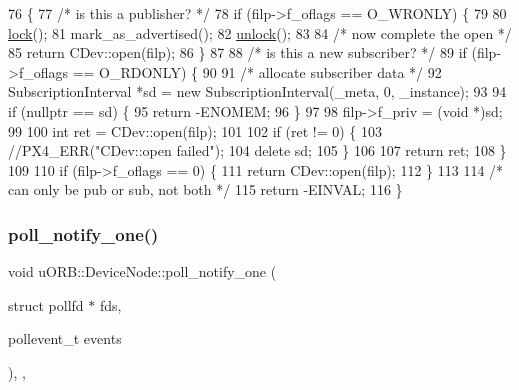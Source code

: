 \begin{DoxyCode}
76 \{
77     \textcolor{comment}{/* is this a publisher? */}
78     \textcolor{keywordflow}{if} (filp->f\_oflags == O\_WRONLY) \{
79 
80         \hyperlink{classcdev_1_1CDev_ae676cccee31dd393ab681414a146d868}{lock}();
81         mark\_as\_advertised();
82         \hyperlink{classcdev_1_1CDev_af65273e0578b277deea057dc7d558e9d}{unlock}();
83 
84         \textcolor{comment}{/* now complete the open */}
85         \textcolor{keywordflow}{return} CDev::open(filp);
86     \}
87 
88     \textcolor{comment}{/* is this a new subscriber? */}
89     \textcolor{keywordflow}{if} (filp->f\_oflags == O\_RDONLY) \{
90 
91         \textcolor{comment}{/* allocate subscriber data */}
92         SubscriptionInterval *sd = \textcolor{keyword}{new} SubscriptionInterval(\_meta, 0, \_instance);
93 
94         \textcolor{keywordflow}{if} (\textcolor{keyword}{nullptr} == sd) \{
95             \textcolor{keywordflow}{return} -ENOMEM;
96         \}
97 
98         filp->f\_priv = (\textcolor{keywordtype}{void} *)sd;
99 
100         \textcolor{keywordtype}{int} ret = CDev::open(filp);
101 
102         \textcolor{keywordflow}{if} (ret != 0) \{
103             \textcolor{comment}{//PX4\_ERR("CDev::open failed");}
104             \textcolor{keyword}{delete} sd;
105         \}
106 
107         \textcolor{keywordflow}{return} ret;
108     \}
109 
110     \textcolor{keywordflow}{if} (filp->f\_oflags == 0) \{
111         \textcolor{keywordflow}{return} CDev::open(filp);
112     \}
113 
114     \textcolor{comment}{/* can only be pub or sub, not both */}
115     \textcolor{keywordflow}{return} -EINVAL;
116 \}
\end{DoxyCode}
\mbox{\label{classuORB_1_1DeviceNode_a77061c03defdcb3eedfc9cdc8b38c003}} 
\subsubsection{\texorpdfstring{poll\+\_\+notify\+\_\+one()}{poll\_notify\_one()}}
{\footnotesize\ttfamily void u\+O\+R\+B\+::\+Device\+Node\+::poll\+\_\+notify\+\_\+one (\begin{DoxyParamCaption}\item[{struct pollfd $\ast$}]{fds,  }\item[{pollevent\+\_\+t}]{events }\end{DoxyParamCaption})\hspace{0.3cm}{\ttfamily [override]}, {\ttfamily [protected]}, {\ttfamily [virtual]}}

